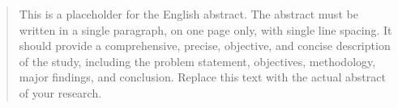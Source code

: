 \begin{abstract}
This is a placeholder for the English abstract. The abstract must be written in a single paragraph, on one page only, with single line spacing. It should provide a comprehensive, precise, objective, and concise description of the study, including the problem statement, objectives, methodology, major findings, and conclusion. Replace this text with the actual abstract of your research.
\end{abstract}
